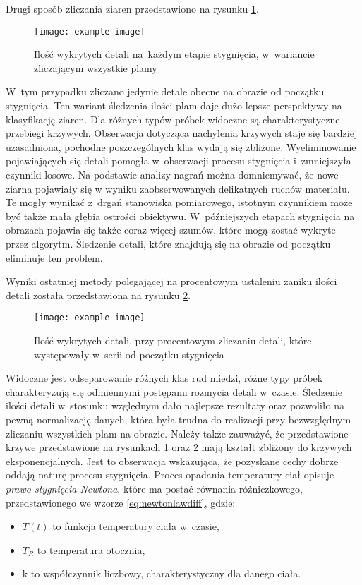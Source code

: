 Drugi sposób zliczania ziaren przedstawiono na rysunku \ref{fig:blobchartrem}.
\begin{figure}[htbp]
    \centering
    \texttt{[image: example-image]}
    \caption{Ilość wykrytych detali na~każdym etapie stygnięcia, w~wariancie
             zliczającym wszystkie plamy}
    \label{fig:blobchartrem}
\end{figure}
W~tym przypadku zliczano jedynie detale obecne na obrazie od początku
stygnięcia.
Ten wariant śledzenia ilości plam daje dużo lepsze perspektywy na klasyfikację
ziaren.
Dla różnych typów próbek widoczne są charakterystyczne przebiegi krzywych.
Obserwacja dotycząca nachylenia krzywych staje się bardziej uzasadniona,
pochodne poszczególnych klas wydają się zbliżone.
Wyeliminowanie pojawiających się detali pomogła w~obserwacji procesu
stygnięcia i~zmniejszyła czynniki losowe.
Na podstawie analizy nagrań można domniemywać, że nowe ziarna pojawiały
się w wyniku zaobserwowanych delikatnych ruchów materiału.
Te mogły wynikać z~drgań stanowiska pomiarowego, istotnym czynnikiem może
być także mała głębia ostrości obiektywu.
W~późniejszych etapach stygnięcia na obrazach pojawia się także coraz więcej
szumów, które mogą zostać wykryte przez algorytm.
Śledzenie detali, które znajdują się na obrazie od początku eliminuje ten
problem.

Wyniki ostatniej metody polegającej na procentowym ustaleniu zaniku ilości
detali została przedstawiona na rysunku \ref{fig:blobcharperc}.
\begin{figure}[htbp]
    \centering
    \texttt{[image: example-image]}
    \caption{Ilość wykrytych detali, przy procentowym zliczaniu detali, które
             występowały w~serii od początku stygnięcia}
    \label{fig:blobcharperc}
\end{figure}
Widoczne jest odseparowanie różnych klas rud miedzi, różne typy próbek
charakteryzują się odmiennymi postępami rozmycia detali w~czasie.
Śledzenie ilości detali w~stosunku względnym dało najlepsze rezultaty
oraz pozwoliło na pewną normalizację danych, która była trudna do realizacji
przy bezwzględnym zliczaniu wszystkich plam na obrazie.
Należy także zauważyć, że przedstawione krzywe przedstawione na rysunkach
\ref{fig:blobchartrem} oraz \ref{fig:blobcharperc} mają kształt zbliżony
do krzywych eksponencjalnych.
Jest to obserwacja wskazująca, że pozyskane cechy dobrze oddają naturę procesu
stygnięcia.
Proces opadania temperatury ciał opisuje \emph{prawo stygnięcia Newtona},
które ma postać równania różniczkowego, przedstawionego we wzorze
\ref{eq:newtonlawdiff}, gdzie:
\begin{itemize}
	\item $ T \left( t \right) $ to funkcja temperatury ciała w~czasie,
	\item $ T_R $ to temperatura otocznia,
	\item k to współczynnik liczbowy, charakterystyczny dla danego ciała.
\end{itemize}

